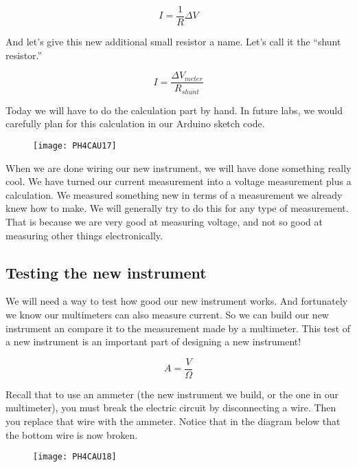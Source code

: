 \begin{equation*}
I=\frac{1}{R}\Delta V
\end{equation*}

And let's give this new additional small resistor a name. Let's call it the ``shunt resistor.''

\begin{equation*}
	I=\frac{\Delta V_{meter}}{R_{shunt}}
\end{equation*}

Today we will have to do the calculation part by hand. In future labs, we would carefully plan for this calculation in our Arduino sketch code.

\begin{figure}[h!]
	\centering
    \texttt{[image: PH4CAU17]}
\end{figure}

When we are done wiring our new instrument, we will have done something really cool. We have turned our current measurement into a voltage measurement plus a calculation. We measured something new in terms of a measurement we already knew how to make. We will generally try to do this for any type of measurement. That is because we are very good at measuring voltage, and not so good at measuring other things electronically.

\subsection{Testing the new instrument}

We will need a way to test how good our new instrument works. And fortunately we know our multimeters can also measure current. So we can build our new instrument an compare it to the measurement made by a multimeter. This test of a new instrument is an important part of designing a new instrument!

\begin{equation*}
	\unit{A}=\frac{\unit{V}}{\unit{\Omega}}
\end{equation*}

Recall that to use an ammeter (the new instrument we build, or the one in our multimeter), you must break the electric circuit by disconnecting a wire. Then you replace that wire with the ammeter. Notice that in the diagram below that the bottom wire is now broken. 

\begin{figure}[h!]
	\centering
     \texttt{[image: PH4CAU18]}
\end{figure}

